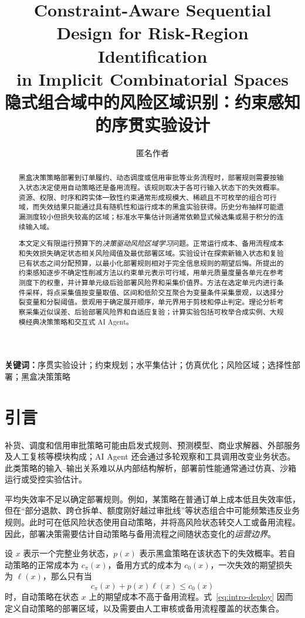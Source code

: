 \documentclass[UTF8,11pt,a4paper,fontset=none]{ctexart}
\title{Constraint-Aware Sequential Design for Risk-Region Identification\\
in Implicit Combinatorial Spaces\\[0.6em]
\large 隐式组合域中的风险区域识别：约束感知的序贯实验设计}
\author{匿名作者}
\date{}
\newcommand{\1}{\mathbf 1}
\begin{document}
\maketitle

\begin{abstract}
黑盒决策策略部署到订单履约、动态调度或信用审批等业务流程时，部署规则需要按输入状态决定使用自动策略还是备用流程。该规则取决于各可行输入状态下的失效概率。资源、权限、时序和跨实体一致性约束通常形成规模大、稀疏且不可枚举的组合可行域，而失效结果只能通过具有随机性和运行成本的黑盒实验获得。历史分布抽样可能遗漏测度较小但损失较高的区域；标准水平集估计则通常依赖显式候选集或易于积分的连续输入域。

本文定义有限运行预算下的\emph{决策驱动风险区域学习}问题。正常运行成本、备用流程成本和失效损失确定状态相关风险阈值及最优部署区域。实验设计在探索新输入状态和复验已有状态之间分配预算，以最小化部署规则相对于完全信息规则的期望后悔。所提出的约束感知逐步不确定性削减方法以约束单元表示可行域，用单元质量度量各单元在参考测度下的权重，并计算单元级后验部署风险界和采集价值界。方法在选定单元内进行条件采样，将点采集值按变量取值、区间和低阶交互聚合为变量条件采集景观，以选择分裂变量和分裂阈值。景观用于确定展开顺序，单元界用于剪枝和停止判定。理论分析考察采集近似误差、后验部署风险界和自适应复验；计算实验包括可枚举合成实例、大规模经典决策策略和交互式 AI Agent。
\end{abstract}

\noindent\textbf{关键词：}序贯实验设计；约束规划；水平集估计；仿真优化；风险区域；选择性部署；黑盒决策策略

\section{引言}

补货、调度和信用审批策略可能由启发式规则、预测模型、商业求解器、外部服务及人工复核等模块构成；AI Agent 还会通过多轮观察和工具调用改变业务状态。此类策略的输入--输出关系难以从内部结构解析，部署前性能通常通过仿真、沙箱运行或受控实验估计。

平均失效率不足以确定部署规则。例如，某策略在普通订单上成本低且失效率低，但在“部分退款、跨仓拆单、额度刚好越过审批线”等状态组合中可能频繁违反业务规则。此时可在低风险状态使用自动策略，并将高风险状态转交人工或备用流程。因此，部署决策需要估计自动策略与备用流程之间随状态变化的\emph{运营边界}。

设 $x$ 表示一个完整业务状态，$p(x)$ 表示黑盒策略在该状态下的失效概率。若自动策略的正常成本为 $c_\pi(x)$，备用方式的成本为 $c_0(x)$，一次失效的期望损失为 $\ell(x)$，那么只有当
\begin{equation}
  c_\pi(x)+p(x)\ell(x)\leq c_0(x)
  \label{eq:intro-deploy}
\end{equation}
时，自动策略在状态 $x$ 上的期望成本不高于备用流程。式~\eqref{eq:intro-deploy} 因而定义自动策略的部署区域，以及需要由人工审核或备用流程覆盖的状态集合。
\end{document}
